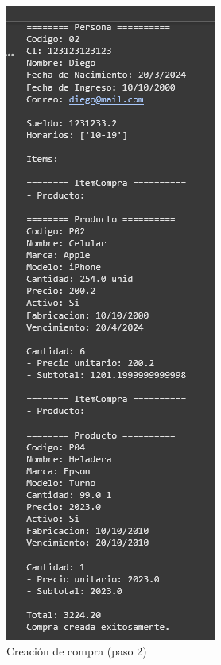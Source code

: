 \documentclass[11pt]{article}
\begin{document}
\begin{multicols}{2}
\begin{figure}[H]
    \centering
    \includegraphics[width=0.5\linewidth]{./anexos/evidencias/crearCompra2.png}
    \caption{Creación de compra (paso 2)}
    \label{fig:crearCompra2}
\end{figure}


\end{multicols}
\end{document}
